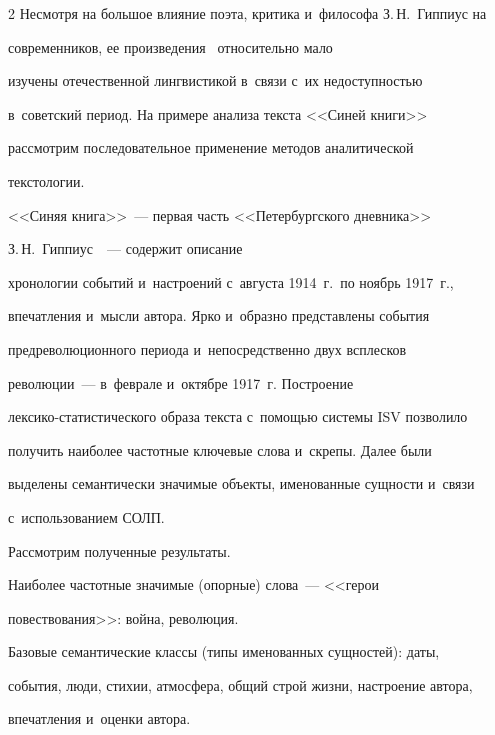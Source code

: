\begin{multicols}{2}
Несмотря на большое влияние поэта, критика и~философа З.\,Н.~Гиппиус на 


современников, ее произведения~\cite{19-koz, 20-koz} относительно мало 


изучены отечественной лингвистикой в~связи с~их не\-до\-ступ\-ностью 


в~советский период. На примере анализа текста <<Синей книги>> 


рассмотрим последовательное применение методов аналитической 


текс\-то\-логии.


     


     <<Синяя книга>>~--- первая часть <<Петербургского дневника>> 


З.\,Н.~Гиппиус~\cite[с.~51--241; 19]{18-koz}~--- содержит описание 


хронологии событий и~настроений с~августа 1914~г.\ по ноябрь 1917~г., 


впечатления и~мысли автора. Ярко и~образно представлены события 


предреволюционного периода и~непосредственно двух всплесков 


революции~--- в~феврале и~октябре 1917~г. Построение 


лек\-си\-ко-ста\-ти\-сти\-че\-ско\-го образа текста с~по\-мощью системы ISV позволило 


получить наиболее частотные ключевые слова и~скрепы. Далее были 


выделены семантически значимые объекты, именованные сущности и~связи 


с~использованием СОЛП.


     


     Рассмотрим полученные результаты.


     


     Наиболее частотные значимые (опорные) слова~--- <<герои 


повествования>>: война, революция.


     


     Базовые семантические классы (типы именованных сущностей): даты, 


события, люди, стихии, атмосфера, общий строй жизни, настроение автора, 


впечатления и~оценки автора.



\end{multicols}
